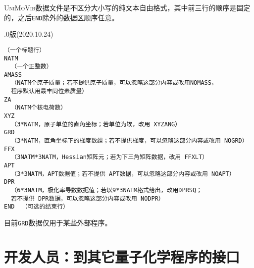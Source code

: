 \documentclass[12pt,a4paper,openany,twoside,cap,UTF8]{ctexbook}
\begin{document}
\textsc{UniMoVib}数据文件是不区分大小写的纯文本自由格式，其中前三行的顺序是固定的，之后\verb|END|除外的数据区顺序任意。

.0版(2020.10.24)
\begin{colorboxed}[oval=false,boxcolor=blue!75!black,bgcolor=blue!5!white]
\ttfamily
\begin{lstlisting}
（一个标题行）
NATM
  （一个正整数）
AMASS
  （NATM个原子质量；若不提供原子质量，可以忽略这部分内容或改用NOMASS，
  程序默认用最丰同位素质量）
ZA
  （NATM个核电荷数）
XYZ
  （3*NATM，原子单位的直角坐标；若单位为埃，改用 XYZANG）
GRD
  （3*NATM，直角坐标下的梯度数组；若不提供梯度，可以忽略这部分内容或改用 NOGRD）
FFX
  （3NATM*3NATM，Hessian矩阵元；若为下三角矩阵数据，改用 FFXLT）
APT
  （3*3NATM，APT数据值；若不提供 APT数据，可以忽略这部分内容或改用 NOAPT）
DPR
  （6*3NATM，极化率导数数据值；若以9*3NATM格式给出，改用DPRSQ；
  若不提供 DPR数据，可以忽略这部分内容或改用 NODPR）
END  （可选的结束行）
\end{lstlisting}\end{colorboxed}
目前\verb|GRD|数据仅用于某些外部程序。

\section{开发人员：到其它量子化学程序的接口} \label{sec:interface}
\end{document}
